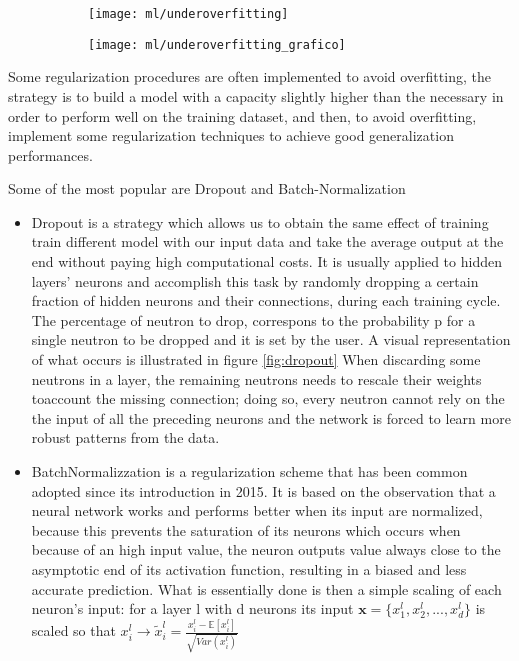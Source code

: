 \documentclass[a4paper,11pt]{article}
\begin{document}
\begin{figure}
\begin{subfigure}{0.4\textwidth}
\texttt{[image: ml/underoverfitting]}
\caption{}
\label{}
\end{subfigure}
\begin{subfigure}{0.4\textwidth}
\texttt{[image: ml/underoverfitting\_grafico]}
\caption{}
\label{}
\end{subfigure}
\caption{}
\label{fig:underoverfitting}
\end{figure}

Some regularization procedures are often implemented to avoid overfitting, the strategy is to build a model with a capacity slightly higher than the necessary in order to perform well on the training dataset, and then, to avoid overfitting, implement some regularization techniques to achieve good generalization performances.

Some of the most popular are Dropout and Batch-Normalization

\begin{itemize}
\item Dropout is a strategy which allows us to obtain the same effect of training train different model with our input data and take the average output at the end without paying high computational costs.
It is usually applied to hidden layers' neurons and accomplish this task by randomly dropping a certain fraction of hidden neurons and their connections, during each training cycle. The percentage of neutron to drop, correspons to the probability p for a single neutron to be dropped and it is set by the user.
A visual representation of what occurs is illustrated in figure \ref{fig:dropout}
When discarding some neutrons in a layer, the remaining neutrons needs to rescale their weights toaccount the missing connection; doing so, every neutron cannot rely on the the input of all the preceding neurons and the network is forced to learn more robust patterns from the data.
\item BatchNormalizzation is a regularization scheme that has been common adopted since its introduction in 2015. It is based on the observation that  a neural network works and performs better when its input are normalized, because this prevents the saturation of its neurons which occurs when because of an high input value, the neuron outputs value always close to the asymptotic end of its activation function, resulting in a biased and less accurate prediction.
What is essentially done is then a simple scaling of each neuron's input: for a layer l with d neurons its input $\mathbf{x} = \{x_1^l, x_2^l, ..., x_d^l\}$ is scaled so that $x_i^l \rightarrow \tilde x_i^l = \frac{x_i^{l} - \mathbb{E}[x_i^l]}{\sqrt{Var(x_i^l)}} $

\end{itemize}
\end{document}
